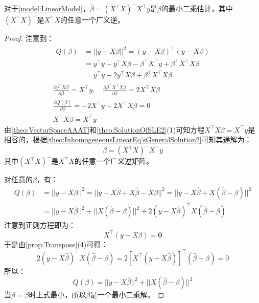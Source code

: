 \begin{theorem}\label{theo:LSELinearModel}
	对于\cref{model:LinearModel}，$\hat{\beta}=(X^{\top}X)^-X^{\top}y$是$\beta$的最小二乘估计，其中$(X^{\top}X)^-$是$X^{\top}X$的任意一个广义逆。
\end{theorem}
\begin{proof}
	注意到：
	\begin{gather*}
		\begin{aligned}
			Q(\beta)&=||y-X\beta||^2=(y-X\beta)^{\top}(y-X\beta) \\
			&=y^{\top}y-y^{\top}X\beta-\beta^{\top}X^{\top}y+\beta^{\top}X^{\top}X\beta \\
			&=y^{\top}y-2y^{\top}X\beta+\beta^{\top}X^{\top}X\beta
		\end{aligned}\\
		\frac{\partial y^{\top}X\beta}{\partial\beta}=X^{\top}y,\quad
		\frac{\partial \beta^{\top}X^{\top}X\beta}{\partial\beta}=2X^{\top}X\beta \\
		\frac{\partial Q(\beta)}{\partial\beta}=-2X^{\top}y+2X^{\top}X\beta=0 \\
		X^{\top}X\beta=X^{\top}y
	\end{gather*}
	由\cref{theo:VectorSpaceAAAT}和\cref{theo:SolutionOfSLE2}(1)可知方程$X^{\top}X\beta=X^{\top}y$是相容的，根据\cref{theo:InhomogeneousLinearEq'sGeneralSolution2}可知其通解为：
	\begin{equation*}
		\hat{\beta}=(X^{\top}X)^-X^{\top}y
	\end{equation*}
	其中$(X^{\top}X)^-$是$X^{\top}X$的任意一个广义逆矩阵。\par
	对任意的$\beta$，有：
	\begin{align*}
		Q(\beta)&=||y-X\beta||^2=||y-X\hat{\beta}+X\hat{\beta}-X\beta||^2=||y-X\hat{\beta}+X(\hat{\beta}-\beta)||^2 \\
		&=||y-X\hat{\beta}||^2+||X(\hat{\beta}-\beta)||^2+2(y-X\hat{\beta})^{\top}X(\hat{\beta}-\beta)
	\end{align*}
	注意到正则方程即为：
	\begin{equation*}
		X^{\top}(y-X\beta)=\mathbf{0}
	\end{equation*}
	于是由\cref{prop:Transpose}(4)可得：
	\begin{equation*}
		2(y-X\hat{\beta})^{\top}X(\hat{\beta}-\beta)=2[X^{\top}(y-X\hat{\beta})]^{\top}(\hat{\beta}-\beta)=0
	\end{equation*}
	所以：
	\begin{equation*}
		Q(\beta)=||y-X\hat{\beta}||^2+||X(\hat{\beta}-\beta)||^2
	\end{equation*}
	当$\beta=\hat{\beta}$时上式最小，所以$\hat{\beta}$是一个最小二乘解。
\end{proof}
